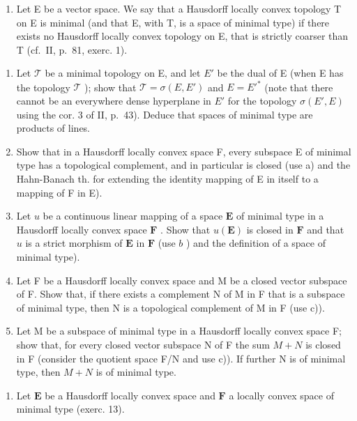 \begin{enumerate}
\def\labelenumi{\arabic{enumi})}
\setcounter{enumi}{12}
\tightlist
\item
  Let E be a vector space. We say that a Hausdorff locally convex topology T on E is minimal (and that E, with T, is a space of minimal type) if there exists no Hausdorff locally convex topology on E, that is strictly coarser than T (cf.~II, p.~81, exerc. 1).
\end{enumerate}

\begin{enumerate}
\def\labelenumi{\alph{enumi})}
\item
  Let \(\mathcal{T}\) be a minimal topology on E, and let \(E'\) be the dual of E (when E has the topology \(\mathcal{T}\) ); show that \(\mathcal{T} = \sigma(E, E')\) and \(E = E'^*\) (note that there cannot be an everywhere dense hyperplane in \(E'\) for the topology \(\sigma(E', E)\) using the cor. 3 of II, p.~43). Deduce that spaces of minimal type are products of lines.
\item
  Show that in a Hausdorff locally convex space F, every subspace E of minimal type has a topological complement, and in particular is closed (use a) and the Hahn-Banach th. for extending the identity mapping of E in itself to a mapping of F in E).
\item
  Let \(u\) be a continuous linear mapping of a space \(\mathbf{E}\) of minimal type in a Hausdorff locally convex space \(\mathbf{F}\) . Show that \(u(\mathbf{E})\) is closed in \(\mathbf{F}\) and that \(u\) is a strict morphism of \(\mathbf{E}\) in \(\mathbf{F}\) (use \(b\) ) and the definition of a space of minimal type).
\item
  Let F be a Hausdorff locally convex space and M be a closed vector subspace of F. Show that, if there exists a complement N of M in F that is a subspace of minimal type, then N is a topological complement of M in F (use c)).
\item
  Let M be a subspace of minimal type in a Hausdorff locally convex space F; show that, for every closed vector subspace N of F the sum \(M + N\) is closed in F (consider the quotient space F/N and use c)). If further N is of minimal type, then \(M + N\) is of minimal type.
\end{enumerate}

\begin{enumerate}
\def\labelenumi{\arabic{enumi})}
\setcounter{enumi}{13}
\tightlist
\item
  Let \(\mathbf{E}\) be a Hausdorff locally convex space and \(\mathbf{F}\) a locally convex space of minimal type (exerc. 13).
\end{enumerate}

